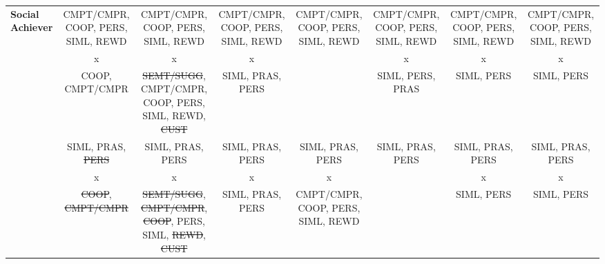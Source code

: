 \begin{landscape}
{\begin{longtable}{|l|c|c|c|c|c|c|c|}
\multirow{3}{*}{\textbf{Social Achiever}}& 
\multicolumn{1}{|p{2.5cm}|}{\centering CMPT/CMPR, COOP, PERS, SIML, REWD}&%
\multicolumn{1}{|p{2.5cm}|}{\centering CMPT/CMPR, COOP, PERS, SIML, REWD}&%
\multicolumn{1}{|p{2.5cm}|}{\centering CMPT/CMPR, COOP, PERS, SIML, REWD}&%
\multicolumn{1}{|p{2.5cm}|}{\centering CMPT/CMPR, COOP, PERS, SIML, REWD}&%
\multicolumn{1}{|p{2.5cm}|}{\centering CMPT/CMPR, COOP, PERS, SIML, REWD}&%
\multicolumn{1}{|p{2.5cm}|}{\centering CMPT/CMPR, COOP, PERS, SIML, REWD}&%
\multicolumn{1}{|p{2.5cm}|}{\centering CMPT/CMPR, COOP, PERS, SIML, REWD}\tabularnewline
& 
\multicolumn{1}{|p{2.5cm}|}{\centering x}&
\multicolumn{1}{|p{2.5cm}|}{\centering x}&
\multicolumn{1}{|p{2.5cm}|}{\centering x}&
&
\multicolumn{1}{|p{2.5cm}|}{\centering x}&
\multicolumn{1}{|p{2.5cm}|}{\centering x}&
\multicolumn{1}{|p{2.5cm}|}{\centering x}\tabularnewline
& 
\multicolumn{1}{|p{2.5cm}|}{\centering COOP, CMPT/CMPR}&%
\multicolumn{1}{|p{2.5cm}|}{\centering \mbox{\st{SEMT/SUGG}}, \mbox{CMPT/CMPR}, COOP, PERS, SIML, REWD, \st{CUST}}&%
\multicolumn{1}{|p{2.5cm}|}{\centering SIML, PRAS, PERS}&%
&%
\multicolumn{1}{|p{2.5cm}|}{\centering SIML, PERS, PRAS}&%
\multicolumn{1}{|p{2.5cm}|}{\centering SIML, PERS}&%
\multicolumn{1}{|p{2.5cm}|}{\centering SIML, PERS}\tabularnewline
\hline
\newpage


\multirow{3}{*}{\textbf{Achiever Dreamer}}& 
\multicolumn{1}{|p{2.5cm}|}{\centering SIML, PRAS, \st{PERS}}&%
\multicolumn{1}{|p{2.5cm}|}{\centering SIML, PRAS, PERS}&%
\multicolumn{1}{|p{2.5cm}|}{\centering SIML, PRAS, PERS}&%
\multicolumn{1}{|p{2.5cm}|}{\centering SIML, PRAS, PERS}&%
\multicolumn{1}{|p{2.5cm}|}{\centering SIML, PRAS, PERS}&%
\multicolumn{1}{|p{2.5cm}|}{\centering SIML, PRAS, PERS}&%
\multicolumn{1}{|p{2.5cm}|}{\centering SIML, PRAS, PERS}\tabularnewline
& 
\multicolumn{1}{|p{2.5cm}|}{\centering x}&
\multicolumn{1}{|p{2.5cm}|}{\centering x}&
\multicolumn{1}{|p{2.5cm}|}{\centering x}&
\multicolumn{1}{|p{2.5cm}|}{\centering x}&
&
\multicolumn{1}{|p{2.5cm}|}{\centering x}&
\multicolumn{1}{|p{2.5cm}|}{\centering x}\tabularnewline
& 
\multicolumn{1}{|p{2.5cm}|}{\centering \st{COOP}, \st{CMPT/CMPR}}&%
\multicolumn{1}{|p{2.5cm}|}{\centering \mbox{\st{SEMT/SUGG}}, \mbox{\st{CMPT/CMPR}}, \st{COOP}, PERS, SIML, \st{REWD}, \st{CUST}}&%
\multicolumn{1}{|p{2.5cm}|}{\centering SIML, PRAS, PERS}&%
\multicolumn{1}{|p{2.5cm}|}{\centering CMPT/CMPR, COOP, PERS, SIML, REWD}&%
&%
\multicolumn{1}{|p{2.5cm}|}{\centering SIML, PERS}&%
\multicolumn{1}{|p{2.5cm}|}{\centering SIML, PERS}\tabularnewline
\hline


\end{longtable}}
\end{landscape}
